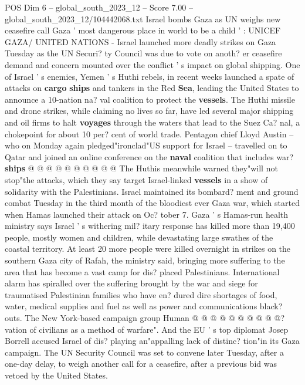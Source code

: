 \begin{textsample}{POS Dim 6 – global\_south\_2023\_12 – Score 7.00 – global\_south\_2023\_12/104442068.txt}  \label{ex:f6_pos_130}
Israel bombs Gaza as UN weighs new ceasefire call Gaza ' most dangerous place in world to be a child ' : UNICEF GAZA/ UNITED NATIONS - Israel launched more deadly strikes on Gaza Tuesday as the UN Securi? ty Council was due to vote on anoth? er ceasefire demand and concern mounted over the conflict ' s impact on global shipping.
One of Israel ' s enemies, Yemen ' s Huthi rebels, in recent weeks launched a spate of attacks on \textbf{cargo} \textbf{ships} and tankers in the Red \textbf{Sea}, leading the United States to announce a 10-nation na? val coalition to protect the \textbf{vessels}.
The Huthi missile and drone strikes, while claiming no lives so far, have led several major shipping and oil firms to halt \textbf{voyages} through the waters that lead to the Suez Ca? nal, a chokepoint for about 10 per? cent of world trade.
Pentagon chief Lloyd Austin -- who on Monday again pledged"ironclad"US support for Israel -- travelled on to Qatar and joined an online conference on the \textbf{naval} coalition that includes war? \textbf{ships} @ @ @ @ @ @ @ @ @ @ The Huthis meanwhile warned they"will not stop"the attacks, which they say target Israel-linked \textbf{vessels} in a show of solidarity with the Palestinians.
Israel maintained its bombard? ment and ground combat Tuesday in the third month of the bloodiest ever Gaza war, which started when Hamas launched their attack on Oc? tober 7.
Gaza ' s Hamas-run health ministry says Israel ' s withering mil? itary response has killed more than 19,400 people, mostly women and children, while devastating large swathes of the coastal territory.
At least 20 more people were killed overnight in strikes on the southern Gaza city of Rafah, the ministry said, bringing more suffering to the area that has become a vast camp for dis? placed Palestinians.
International alarm has spiralled over the suffering brought by the war and siege for traumatised Palestinian families who have en? dured dire shortages of food, water, medical supplies and fuel as well as power and communications black? outs.
The New York-based campaign group Human @ @ @ @ @ @ @ @ @ @? vation of civilians as a method of warfare".
And the EU ' s top diplomat Josep Borrell accused Israel of dis? playing an"appalling lack of distinc? tion"in its Gaza campaign.
The UN Security Council was set to convene later Tuesday, after a one-day delay, to weigh another call for a ceasefire, after a previous bid was vetoed by the United States.

\end{textsample}
